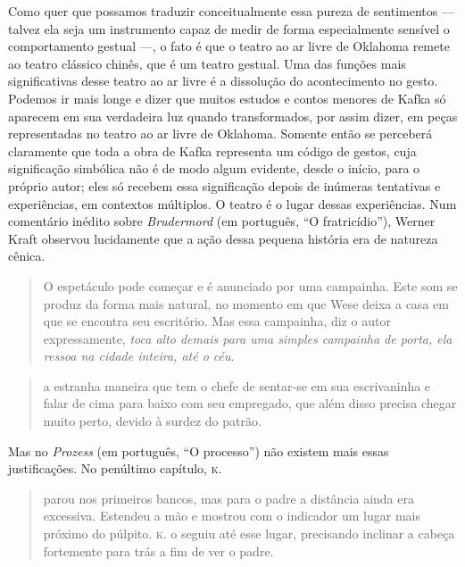 Como quer que possamos traduzir
conceitualmente essa pureza de sentimentos --- talvez ela seja um
instrumento capaz de medir de forma especialmente sensível o
comportamento gestual ---, o fato é que o teatro ao ar livre de Oklahoma
remete ao teatro clássico chinês, que é um teatro gestual. Uma das
funções mais significativas desse teatro ao ar livre é a dissolução do
acontecimento no gesto. Podemos ir mais longe e dizer que muitos estudos
e contos menores de Kafka só aparecem em sua verdadeira luz quando
transformados, por assim dizer, em peças representadas no teatro ao ar
livre de Oklahoma. Somente então se perceberá claramente que toda a obra
de Kafka representa um código de gestos, cuja significação simbólica não
é de modo algum evidente, desde o início, para o próprio autor; eles só
recebem essa significação depois de inúmeras tentativas e experiências,
em contextos múltiplos. O teatro é o lugar dessas experiências. Num
comentário inédito sobre \textit{Brudermord} (em português, ``O fratricídio''), Werner Kraft
observou lucidamente que a ação dessa pequena história era de natureza
cênica. 

\begin{quote}
O espetáculo pode começar e é anunciado por uma campainha.
Este som se produz da forma mais natural, no momento em que Wese deixa a
casa em que se encontra seu escritório. Mas essa campainha, diz o autor
expressamente, \textit{toca alto demais para uma simples campainha de porta,
ela ressoa na cidade inteira, até o céu}. 
\end{quote}


\begin{quote}
a estranha maneira que tem o chefe de sentar-se em sua escrivaninha e
falar de cima para baixo com seu empregado, que além disso precisa
chegar muito perto, devido à surdez do patrão.
\end{quote} 

Mas no \textit{Prozess} (em português, ``O
processo'') não existem mais essas justificações. No penúltimo capítulo, \textsc{k.} 

\begin{quote}
parou nos primeiros bancos, mas para o padre a distância ainda era
excessiva. Estendeu a mão e mostrou com o indicador um lugar mais
próximo do púlpito. \textsc{k.} o seguiu até esse lugar, precisando inclinar a
cabeça fortemente para trás a fim de ver o padre.
\end{quote}

